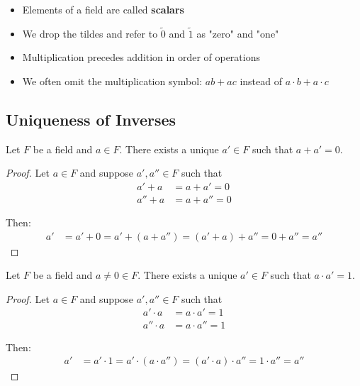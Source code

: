 \begin{itemize}
    \item Elements of a field are called \textbf{scalars}
    \item We drop the tildes and refer to $\tilde{0}$ and $\tilde{1}$ as "zero" and "one"
    \item Multiplication precedes addition in order of operations
    \item We often omit the multiplication symbol: $ab + ac$ instead of $a \cdot b + a \cdot c$
\end{itemize}

\subsection{Uniqueness of Inverses}

\begin{proposition}\label{prop:unique-additive-inverse}
    Let $F$ be a field and $a \in F$. There exists a unique $a' \in F$ such that $a + a' = 0$.
\end{proposition}

\begin{proof}
    Let $a \in F$ and suppose $a', a'' \in F$ such that
    \begin{align*}
        a' + a &= a + a' = 0 \\
        a'' + a &= a + a'' = 0
    \end{align*}
    
    Then:
    \begin{align*}
        a' &= a' + 0 = a' + (a + a'') = (a' + a) + a'' = 0 + a'' = a''
    \end{align*}
\end{proof}

\begin{proposition}\label{prop:unique-multiplicative-inverse}
    Let $F$ be a field and $a \neq 0 \in F$. There exists a unique $a' \in F$ such that $a \cdot a' = 1$.
\end{proposition}

\begin{proof}
    Let $a \in F$ and suppose $a', a'' \in F$ such that
    \begin{align*}
        a' \cdot a &= a \cdot a' = 1 \\
        a'' \cdot a &= a \cdot a'' = 1
    \end{align*}
    
    Then:
    \begin{align*}
        a' &= a' \cdot 1 = a' \cdot (a \cdot a'') = (a' \cdot a) \cdot a'' = 1 \cdot a'' = a''
    \end{align*}
\end{proof}

